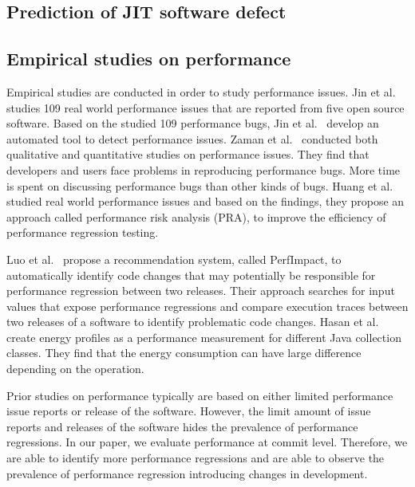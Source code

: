 \subsection{Prediction of JIT software defect}

\subsection{Empirical studies on performance}
Empirical studies are conducted in order to study performance issues. Jin et al.~\cite{Jin:2012} studies 109 real world performance issues that are reported from five open source software. Based on the studied 109 performance bugs, Jin et al.~\cite{Jin:2012} develop an automated tool to detect performance issues. Zaman et al.~\cite{MSR11:Zaman,MSR12:Zaman} conducted both qualitative and quantitative studies on performance issues. They find that developers and users face problems in reproducing performance bugs. More time is spent on discussing performance bugs than other kinds of bugs. Huang et al.~\cite{ICSE2014:Huang} studied real world performance issues and based on the findings, they propose an approach called performance risk analysis (PRA), to improve the efficiency of performance regression testing. 

Luo et al.~\cite{ACM2016:Luo} propose a recommendation system, called PerfImpact, to automatically identify code changes that may potentially be responsible for performance regression between two releases. Their approach searches for input values that expose performance regressions and compare execution traces between two releases of a software to identify problematic code changes. Hasan et al.~\cite{Hasan:icse2016} create energy profiles as a performance measurement for different Java collection classes. They find that the energy consumption can have large difference depending on the operation.

Prior studies on performance typically are based on either limited performance issue reports or release of the software. However, the limit amount of issue reports and releases of the software hides the prevalence of performance regressions. In our paper, we evaluate performance at commit level. Therefore, we are able to identify more performance regressions and are able to observe the prevalence of performance regression introducing changes in development. 

